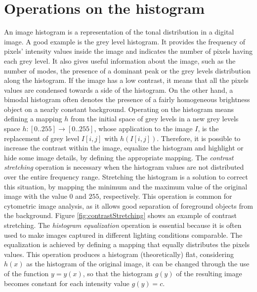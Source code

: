 \section{Operations on the histogram}\label{histop} %
An image histogram is a representation of the tonal distribution in a digital image. A good example is the grey level histogram. It provides the frequency of pixels' intensity values inside the image and indicates the number of pixels having each grey level. 
It also gives useful information about the image, such as the number of modes, the presence of a dominant peak or the grey levels distribution along the histogram. If the image has a low contrast, it means that all the pixels values are condensed towards a side of the histogram. On the other hand, a bimodal histogram often denotes the presence of a fairly homogeneous brightness object on a nearly constant background. Operating on the histogram means defining a mapping $h$ from the initial space of grey levels in a new grey levels space $h: [0..255] \rightarrow [0..255]$, whose application to the image $I$, is the replacement of grey level $I[i, j]$ with $h(I[i, j])$. Therefore, it is possible to increase the contrast within the image, equalize the histogram and highlight or hide some image details, by defining the appropriate mapping.
The \textit{contrast stretching} operation is necessary when the histogram values are not distributed over the entire frequency range. Stretching the histogram is a solution to correct this situation, by mapping the minimum and the maximum value of the original image with the value $0$ and $255$, respectively. This operation is common for cytometric image analysis, as it allows good separation of foreground objects from the background. Figure \ref{fig:contrastStretching} shows an example of contrast stretching.
The \textit{histogram equalization} operation is essential because it is often used to make images captured in different lighting conditions comparable. The equalization is achieved by defining a mapping that equally distributes the pixels values. This operation produces a histogram (theoretically) flat, considering $h(x)$ as the histogram of the original image, it can be changed through the use of the function $y = y(x)$, so that the histogram $g(y)$ of the resulting image becomes constant for each intensity value $g(y) = c$.

